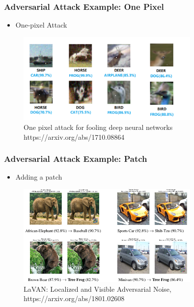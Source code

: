 \documentclass[8pt,dvipsnames]{beamer}
\begin{document}
\begin{frame}
    \frametitle{Adversarial Attack Example: One Pixel}
    \begin{itemize}
        \item One-pixel Attack
    \end{itemize}
    \begin{figure}
    	\centering
    	\includegraphics[width=0.8\textwidth]{imgs/adv_overview_4.png}
    	\caption{One pixel attack for fooling deep neural networks https://arxiv.org/abs/1710.08864}
    \end{figure}
\end{frame}
\begin{frame}
	\frametitle{Adversarial Attack Example: Patch}
	\begin{itemize}
		\item Adding a patch
	\end{itemize}
	    \begin{figure}
		\centering
		\includegraphics[width=0.8\textwidth]{imgs/adv_overview_5.png}
		\caption{LaVAN: Localized and Visible Adversarial Noise, https://arxiv.org/abs/1801.02608}
	\end{figure}
\end{frame}
\end{document}
